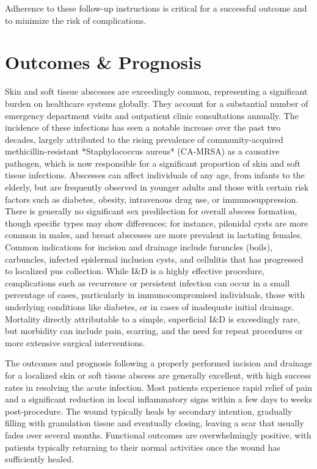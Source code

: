 Adherence to these follow-up instructions is critical for a successful outcome and to minimize the risk of complications.

\section*{Outcomes \& Prognosis}
Skin and soft tissue abscesses are exceedingly common, representing a significant burden on healthcare systems globally. They account for a substantial number of emergency department visits and outpatient clinic consultations annually. The incidence of these infections has seen a notable increase over the past two decades, largely attributed to the rising prevalence of community-acquired methicillin-resistant *Staphylococcus aureus* (CA-MRSA) as a causative pathogen, which is now responsible for a significant proportion of skin and soft tissue infections. Abscesses can affect individuals of any age, from infants to the elderly, but are frequently observed in younger adults and those with certain risk factors such as diabetes, obesity, intravenous drug use, or immunosuppression. There is generally no significant sex predilection for overall abscess formation, though specific types may show differences; for instance, pilonidal cysts are more common in males, and breast abscesses are more prevalent in lactating females. Common indications for incision and drainage include furuncles (boils), carbuncles, infected epidermal inclusion cysts, and cellulitis that has progressed to localized pus collection. While I\&D is a highly effective procedure, complications such as recurrence or persistent infection can occur in a small percentage of cases, particularly in immunocompromised individuals, those with underlying conditions like diabetes, or in cases of inadequate initial drainage. Mortality directly attributable to a simple, superficial I\&D is exceedingly rare, but morbidity can include pain, scarring, and the need for repeat procedures or more extensive surgical interventions.

The outcomes and prognosis following a properly performed incision and drainage for a localized skin or soft tissue abscess are generally excellent, with high success rates in resolving the acute infection. Most patients experience rapid relief of pain and a significant reduction in local inflammatory signs within a few days to weeks post-procedure. The wound typically heals by secondary intention, gradually filling with granulation tissue and eventually closing, leaving a scar that usually fades over several months. Functional outcomes are overwhelmingly positive, with patients typically returning to their normal activities once the wound has sufficiently healed.

